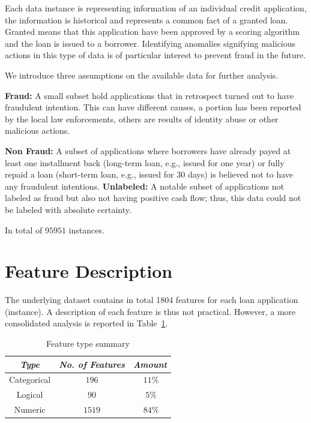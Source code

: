 Each data instance is representing information of an individual credit application, the information is historical and represents a common fact of a granted loan. Granted means that this application have been approved by a scoring algorithm and the loan is issued to a borrower. Identifying anomalies signifying malicious actions in this type of data is of particular interest to prevent fraud in the future.

We introduce three assumptions on the available data for further analysis.

\textbf{Fraud:} 
A small subset hold applications that in retrospect turned out to have fraudulent intention. This can have different causes, a portion has been reported by the local law enforcements, others are results of identity abuse or other malicious actions.

\textbf{Non Fraud:} 
A subset of applications where borrowers have already payed at least one installment back (long-term loan, e.g., issued for one year) or fully repaid a loan (short-term loan, e.g., issued for 30 days) is believed not to have any fraudulent intentions. 
\textbf{Unlabeled:}
A notable subset of applications not labeled as fraud but also not having positive cash flow; thus, this data could not be labeled with absolute certainty.

In total of \(95951\) instances.

\section{Feature Description}\label{Ch:2:FeatureDesc}
The underlying dataset contains in total 1804 features for each loan application (instance). A description of each feature is thus not practical. However, a more consolidated analysis is reported in Table~\ref{tab:feature-summary}. 

\begin{table}[h!]
  \begin{center}
    \caption{Feature type summary}
    \label{tab:feature-summary}
    \begin{tabular}{|c|c|c|}\hline
    \textit{Type} & \textit{No. of Features} & \textit{Amount} \\
      \hline
     Categorical & \(196\) & \(~11\%\) \\ 
     \hline
     Logical & \(90\) &  \(~5\%\) \\
     \hline
     Numeric & \(1519\) &  \(~84\%\) \\
     \hline
    \end{tabular}
  \end{center}
\end{table}

